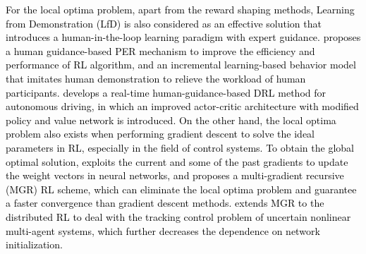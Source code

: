 \documentclass[journal]{IEEEtran}
\begin{document}
\textcolor{black}{
For the local optima problem, apart from the reward shaping methods, Learning from Demonstration (LfD) is also considered as an effective solution that introduces a human-in-the-loop learning paradigm with expert guidance.
\citep{wu2022prioritized} proposes a human guidance-based PER mechanism to improve the efficiency and performance of RL algorithm, and an incremental learning-based behavior model that imitates human demonstration to relieve the workload of human participants.
\citep{wu2022toward} develops a real-time human-guidance-based DRL method for autonomous driving, in which an improved actor-critic architecture with modified policy and value network is introduced.
On the other hand, the local optima problem also exists when performing gradient descent to solve the ideal parameters in RL, especially in the field of control systems.
To obtain the global optimal solution, \citep{bai2019adaptive} exploits the current and some of the past gradients to update the weight vectors in neural networks, and proposes a multi-gradient recursive (MGR) RL scheme, which can eliminate the local optima problem and guarantee a faster convergence than gradient descent methods.
\citep{bai2021event} extends MGR to the distributed RL to deal with the tracking control problem of uncertain nonlinear multi-agent systems, which further decreases the dependence on network initialization.}
\end{document}
